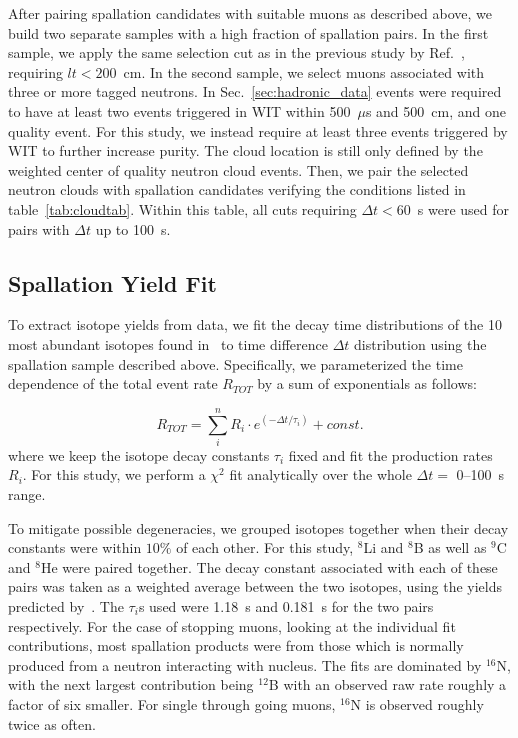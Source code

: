 After pairing spallation candidates with suitable muons as described above, we build two separate samples with a high fraction of spallation pairs. In the first sample, we apply the same selection cut as in the previous study by Ref.~\cite{SKspall_zhang}, requiring $lt<200$~cm. In the second sample, we select muons associated with three or more tagged neutrons. In Sec.~\ref{sec:hadronic_data} events were required to have at least two events triggered in WIT within 500~$\mu$s and 500~cm, and one quality event. For this study, we instead require at least three events triggered by WIT to further increase purity. The cloud location is still only defined by the weighted center of quality neutron cloud events. Then, we pair the selected neutron clouds with spallation candidates verifying the conditions listed in table~\ref{tab:cloudtab}. Within this table, all cuts requiring $\Delta t < 60$~s were used for pairs with $\Delta t$ up to 100~s.

\subsection{Spallation Yield Fit}
\label{sec:yieldfit}
To extract isotope yields from data, we fit the decay time distributions of the 10 most abundant isotopes found in~\cite{SKspall_zhang,BLi_1} to time difference $\Delta t$ distribution using the spallation sample described above. Specifically, we parameterized the time dependence of the total event rate $R_{TOT}$ by a sum of exponentials as follows:

\begin{equation}
    R_{TOT} = \sum_i^n R_i\cdot e^{(-\Delta t/\tau_i)} + const.
\label{eq:allfit}
\end{equation}
where we keep the isotope decay constants $\tau_i$ fixed and fit the production rates $R_i$. For this study, we perform a $\chi^2$ fit analytically over the whole $\Delta t = $ 0--100~s range.  

To mitigate possible degeneracies, we grouped isotopes together when their decay constants were within $10\%$ of each other. For this study, $^8$Li and $^8$B as well as $^9$C and $^8$He were paired together. The decay constant associated with each of these pairs was taken as a weighted average between the two isotopes, using the yields predicted by~\cite{BLi_1}.
The $\tau_i$s used were 1.18~s and 0.181~s for the two pairs respectively. For the case of stopping muons, looking at the individual fit contributions, most spallation products were from those which is normally produced from a neutron interacting with nucleus. The fits are dominated by $^{16}$N, with the next largest contribution being $^{12}$B with an observed raw rate roughly a factor of six smaller. For single through going muons, $^{16}$N is observed roughly twice as often. 

